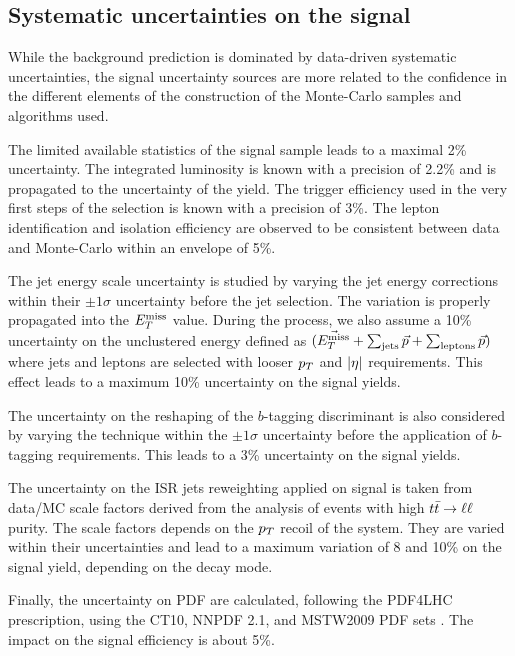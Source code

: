     \subsection{Systematic uncertainties on the signal}

    While the background prediction is dominated by data-driven systematic
    uncertainties, the signal uncertainty sources are more related to the
    confidence in the different elements of the construction of the Monte-Carlo
    samples and algorithms used.

    The limited available statistics of the signal sample leads to a maximal 2\%
    uncertainty. The integrated luminosity is known with a precision of 2.2\%
    and is propagated to the uncertainty of the yield. The trigger efficiency
    used in the very first steps of the selection is known with a precision of
    3\%.  The lepton identification and isolation efficiency are observed to be
    consistent between data and Monte-Carlo within an envelope of 5\%.

    The jet energy scale uncertainty is studied by varying the jet energy
    corrections within their $\pm1\sigma$ uncertainty before the jet selection.
    The variation is properly propagated into the $E_T^\text{miss}$ value. During the
    process, we also assume a 10\% uncertainty on the unclustered energy defined
    as $(\vec{E_T^\text{miss}} + \sum_\text{jets} \vec{p} + \sum_\text{leptons} \vec{p})$
    where jets and leptons are selected with looser $p_T$ and $\left| \eta \right|$
    requirements. This effect leads to a maximum 10\% uncertainty on the signal
    yields.

    The uncertainty on the reshaping of the $b$-tagging discriminant is also
    considered by varying the technique within the $\pm1\sigma$ uncertainty
    before the application of $b$-tagging requirements. This leads to a 3\%
    uncertainty on the signal yields.

    The uncertainty on the ISR jets reweighting applied on signal is taken from
    data/MC scale factors derived from the analysis of events with high
    $t\bar{t} \rightarrow \ell \ell$ purity. The scale factors depends on the $p_T$ recoil of the
    system. They are varied within their uncertainties and lead to a maximum
    variation of 8 and 10\% on the signal yield, depending on the decay mode.

    Finally, the uncertainty on PDF are calculated, following the PDF4LHC
    prescription, using the CT10, NNPDF 2.1, and MSTW2009 PDF sets
    \cite{PDF4LHC}. The impact on the signal efficiency is about 5\%.

